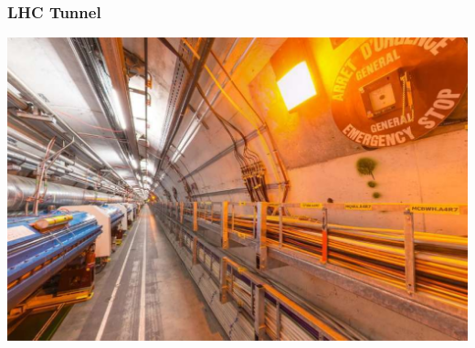 \documentclass{beamer}
\begin{document}
\begin{frame}
    \frametitle{LHC Tunnel}
    \includegraphics[scale=0.5]{LHCTunnel.pdf}
\end{frame}
\end{document}
